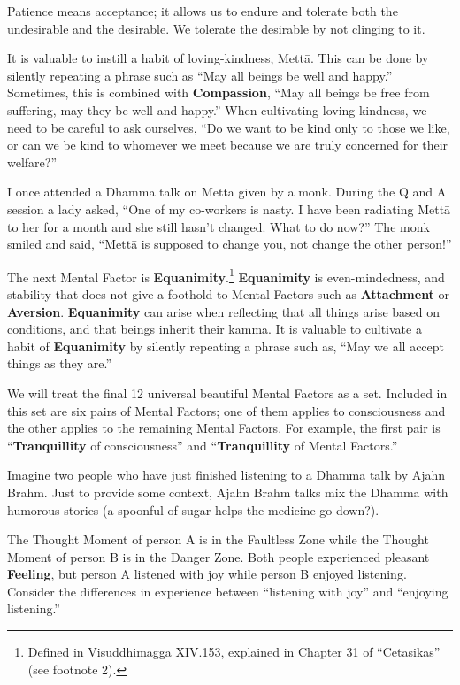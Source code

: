 Patience means acceptance; it allows us to endure and tolerate both the undesirable and the desirable. We tolerate the desirable by not clinging to it.

It is valuable to instill a habit of loving-kindness, Mettā. This can be done by silently repeating a phrase such as “May all beings be well and happy.” Sometimes, this is combined with \textbf{Compassion}, “May all beings be free from suffering, may they be well and happy.” When cultivating loving-kindness, we need to be careful to ask ourselves, “Do we want to be kind only to those we like, or can we be kind to whomever we meet because we are truly concerned for their welfare?”

I once attended a Dhamma talk on Mettā given by a monk. During the Q and A session a lady asked, “One of my co-workers is nasty. I have been radiating Mettā to her for a month and she still hasn’t changed. What to do now?” The monk smiled and said, “Mettā is supposed to change you, not change the other person!”

The next Mental Factor is \textbf{Equanimity}.\footnote{Defined in Visuddhimagga XIV.153, explained in Chapter 31 of “Cetasikas” (see footnote 2).} \textbf{Equanimity} is even-mindedness, and stability that does not give a foothold to Mental Factors such as \textbf{Attachment} or \textbf{Aversion}. \textbf{Equanimity} can arise when reflecting that all things arise based on conditions, and that beings inherit their kamma. It is valuable to cultivate a habit of \textbf{Equanimity} by silently repeating a phrase such as, “May we all accept things as they are.”

We will treat the final 12 universal beautiful Mental Factors as a set. Included in this set are six pairs of Mental Factors; one of them applies to consciousness and the other applies to the remaining Mental Factors. For example, the first pair is “\textbf{Tranquillity} of consciousness” and “\textbf{Tranquillity} of Mental Factors.”

Imagine two people who have just finished listening to a Dhamma talk by Ajahn Brahm. Just to provide some context, Ajahn Brahm talks mix the Dhamma with humorous stories (a spoonful of sugar helps the medicine go down?).

The Thought Moment of person A is in the Faultless Zone while the Thought Moment of person B is in the Danger Zone. Both people experienced pleasant \textbf{Feeling}, but person A listened with joy while person B enjoyed listening. Consider the differences in experience between “listening with joy” and “enjoying listening.”

